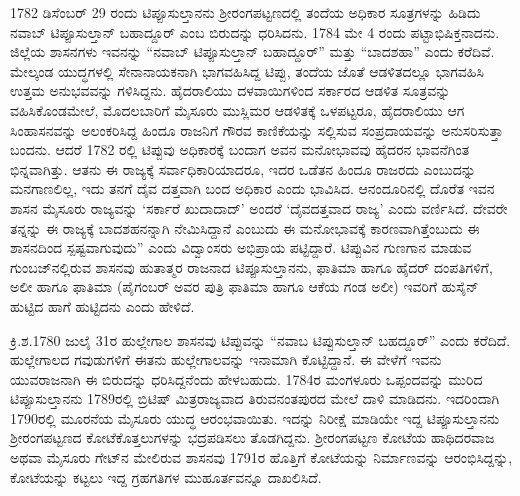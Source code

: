 1782 ಡಿಸೆಂಬರ್​ 29 ರಂದು ಟಿಪ್ಪೂಸುಲ್ತಾನನು ಶ‍್ರೀರಂಗಪಟ್ಟಣದಲ್ಲಿ ತಂದೆಯ ಅಧಿಕಾರ ಸೂತ್ರಗಳನ್ನು ಹಿಡಿದು ನವಾಬ್​ ಟಿಪ್ಪೂಸುಲ್ತಾನ್​ ಬಹಾದ್ದೂರ್​ ಎಂಬ ಬಿರುದನ್ನು ಧರಿಸಿದನು. 1784 ಮೇ 4 ರಂದು ಪಟ್ಟಾಭಿಷಿಕ್ತನಾದನು. ಜಿಲ್ಲೆಯ ಶಾಸನಗಳು ಇವನನ್ನು “ನವಾಬ್​ ಟಿಪ್ಪೂಸುಲ್ತಾನ್​ ಬಹಾದ್ದೂರ್​” ಮತ್ತು “ಬಾದಶಹಾ” ಎಂದು ಕರೆದಿವೆ. ಮೇಲ್ಕಂಡ ಯುದ್ಧಗಳಲ್ಲಿ ಸೇನಾನಾಯಕನಾಗಿ ಭಾಗವಹಿಸಿದ್ದ ಟಿಪ್ಪು, ತಂದೆಯ ಜೊತೆ ಆಡಳಿತದಲ್ಲೂ ಭಾಗವಹಿಸಿ ಉತ್ತಮ ಅನುಭವವನ್ನು ಗಳಿಸಿದ್ದನು. ಹೈದರಾಲಿಯು ದಳವಾಯಿಗಳಿಂದ ಸರ್ಕಾರದ ಆಡಳಿತ ಸೂತ್ರವನ್ನು ವಹಿಸಿಕೊಂಡಮೇಲೆ, ಮೊದಲಬಾರಿಗೆ ಮೈಸೂರು ಮುಸ್ಲಿಮರ ಆಡಳಿತಕ್ಕೆ ಒಳಪಟ್ಟರೂ, ಹೈದರಾಲಿಯು ಆಗ ಸಿಂಹಾಸನವನ್ನು ಅಲಂಕರಿಸಿದ್ದ ಹಿಂದೂ ರಾಜನಿಗೆ ಗೌರವ ಕಾಣಿಕೆಯನ್ನು ಸಲ್ಲಿಸುವ ಸಂಪ್ರದಾಯವನ್ನು ಅನುಸರಿಸುತ್ತಾ ಬಂದನು. ಆದರೆ 1782 ರಲ್ಲಿ ಟಿಪ್ಪುವು ಅಧಿಕಾರಕ್ಕೆ ಬಂದಾಗ ಅವನ ಮನೋಭಾವವು ಹೈದರನ ಭಾವನೆಗಿಂತ ಭಿನ್ನವಾಗಿತ್ತು. ಆತನು ಈ ರಾಜ್ಯಕ್ಕೆ ಸರ್ವಾಧಿಕಾರಿಯಾದರೂ, ಇದರ ಒಡೆತನ ಹಿಂದೂ ರಾಜರದು ಎಂಬುದನ್ನು ಮನಗಾಣಲಿಲ್ಲ, ಇದು ತನಗೆ ದೈವ ದತ್ತವಾಗಿ ಬಂದ ಅಧಿಕಾರ ಎಂದು ಭಾವಿಸಿದ. ಆನಂದೂರಿನಲ್ಲಿ ದೊರೆತ ಇವನ ಶಾಸನ ಮೈಸೂರು ರಾಜ್ಯವನ್ನು ‘ಸರ್ಕಾರೆ ಖುದಾದಾದ್​’ ಅಂದರೆ ‘ದೈವದತ್ತವಾದ ರಾಜ್ಯ’ ಎಂದು ವರ್ಣಿಸಿದೆ. ದೇವರೇ ತನ್ನನ್ನು ಈ ರಾಜ್ಯಕ್ಕೆ ಬಾದಶಹನನ್ನಾಗಿ ನೇಮಿಸಿದ್ದಾನೆ ಎಂಬುದು ಈ ಮನೋಭಾವಕ್ಕೆ ಕಾರಣವಾಗಿತ್ತೆಂಬುದು ಈ ಶಾಸನದಿಂದ ಸ್ಪಷ್ಟವಾಗುವುದು” ಎಂದು ವಿದ್ವಾಂಸರು ಅಭಿಪ್ರಾಯ ಪಟ್ಟಿದ್ದಾರೆ. ಟಿಪ್ಪುವಿನ ಗುಣಗಾನ ಮಾಡುವ ಗುಂಬಜ್​ನಲ್ಲಿರುವ ಶಾಸನವು ಹುತಾತ್ಮರ ರಾಜನಾದ ಟಿಪ್ಪೂಸುಲ್ತಾನನು, ಫಾತಿಮಾ ಹಾಗೂ ಹೈದರ್​ ದಂಪತಿಗಳಿಗೆ, ಅಲೀ ಹಾಗೂ ಫಾತಿಮಾ (ಪೈಗಂಬರ್​ ಅವರ ಪುತ್ರಿ ಫಾತಿಮಾ ಹಾಗೂ ಆಕೆಯ ಗಂಡ ಅಲೀ) ಇವರಿಗೆ ಹುಸೈನ್​ ಹುಟ್ಟಿದ ಹಾಗೆ ಹುಟ್ಟಿದನು ಎಂದು ಹೇಳಿದೆ.

ಕ್ರಿ.ಶ.1780 ಜುಲೈ 31ರ ಹುಲ್ಲೇಗಾಲ ಶಾಸನವು ಟಿಪ್ಪುವನ್ನು “ನವಾಬ ಟಿಪ್ಪುಸುಲ್ತಾನ್​ ಬಹದ್ದೂರ್​” ಎಂದು ಕರೆದಿದೆ. ಹುಲ್ಲೇಗಾಲದ ಗವುಡುಗಳಿಗೆ ಈತನು ಹುಲ್ಲೇಗಾಲವನ್ನು ಇನಾಮಾಗಿ ಕೊಟ್ಟಿದ್ದಾನೆ. ಈ ವೇಳೆಗೆ ಇವನು ಯುವರಾಜನಾಗಿ ಈ ಬಿರುದನ್ನು ಧರಿಸಿದ್ದನೆಂದು ಹೇಳಬಹುದು. 1784ರ ಮಂಗಳೂರು ಒಪ್ಪಂದವನ್ನು ಮುರಿದ ಟಿಪ್ಪೂಸುಲ್ತಾನನು 1789ರಲ್ಲಿ ಬ್ರಿಟಿಷ್​ ಮಿತ್ರರಾಜ್ಯವಾದ ತಿರುವನಂತಪುರದ ಮೇಲೆ ದಾಳಿ ಮಾಡಿದನು. ಇದರಿಂದಾಗಿ 1790ರಲ್ಲಿ ಮೂರನೆಯ ಮೈಸೂರು ಯುದ್ಧ ಆರಂಭವಾಯಿತು. ಇದನ್ನು ನಿರೀಕ್ಷೆ ಮಾಡಿಯೇ ಇದ್ದ ಟಿಪ್ಪೂಸುಲ್ತಾನನು ಶ‍್ರೀರಂಗಪಟ್ಟಣದ ಕೋಟೆಕೊತ್ತಲುಗಳನ್ನು ಭದ್ರಪಡಿಸಲು ತೊಡಗಿದ್ದನು. ಶ‍್ರೀರಂಗಪಟ್ಟಣ ಕೋಟೆಯ ಹಾಥಿದರವಾಜ ಅಥವಾ ಮೈಸೂರು ಗೇಟ್​ನ ಮೇಲಿರುವ ಶಾಸನವು 1791ರ ಹೊತ್ತಿಗೆ ಕೋಟೆಯನ್ನು ನಿರ್ಮಾಣವನ್ನು ಆರಂಭಿಸಿದ್ದನ್ನು, ಕೋಟೆಯನ್ನು ಕಟ್ಟಲು ಇದ್ದ ಗ್ರಹಗತಿಗಳ ಮುಹೂರ್ತವನ್ನೂ ದಾಖಲಿಸಿದೆ.

